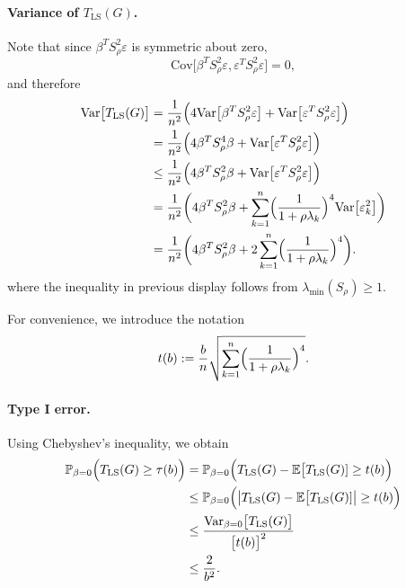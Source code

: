 \documentclass{article}
\newcommand{\abs}[1]{\left \lvert #1 \right \rvert}
\newcommand{\Var}{\mathrm{Var}}
\newcommand{\Cov}{\mathrm{Cov}}
\newcommand{\1}{\mathbf{1}}
\newcommand{\Pbb}{\mathbb{P}}
\newcommand{\Ebb}{\mathbb{E}}
\newcommand{\LS}{\mathrm{LS}}
\theoremstyle{alden}
\theoremstyle{aldenthm}
\theoremstyle{definition}
\theoremstyle{remark}
\begin{document}
\paragraph{Variance of $T_{\LS}(G)$.}
Note that since $\beta^T S_{\rho}^2 \varepsilon$ is symmetric about zero, 
\begin{equation*}
\Cov\bigl[\beta^T S_{\rho}^2 \varepsilon, \varepsilon^T S_{\rho}^2 \varepsilon\bigr] = 0,
\end{equation*}
and therefore
\begin{align*}
\Var\bigl[T_{\LS}(G)\bigr] & = \frac{1}{n^2}\Bigl(4 \Var\bigl[\beta^T S_\rho^2 \varepsilon \bigr] + \Var\bigl[\varepsilon^T S_{\rho}^2 \varepsilon\bigr]\Bigr) \\
& = \frac{1}{n^2}\Bigl(4 \beta^T S_{\rho}^4 \beta + \Var\bigl[\varepsilon^T S_{\rho}^2 \varepsilon\bigr]\Bigr) \\
& \leq \frac{1}{n^2}\Bigl(4 \beta^T S_{\rho}^2 \beta + \Var\bigl[\varepsilon^T S_{\rho}^2 \varepsilon\bigr]\Bigr) \\
& = \frac{1}{n^2}\biggl(4 \beta^T  S_{\rho}^2 \beta + \sum_{k = 1}^{n} \Bigl(\frac{1}{1 + \rho \lambda_k}\Bigr)^4 \Var\bigl[\varepsilon_k^2\bigr]\biggr) \\
& = \frac{1}{n^2}\biggl(4 \beta^T S_{\rho}^2 \beta + 2\sum_{k = 1}^{n} \Bigl(\frac{1}{1 + \rho \lambda_k}\Bigr)^4 \biggr).
\end{align*}
where the inequality in previous display follows from $\lambda_{\min}(S_{\rho}) \geq 1$.

For convenience, we introduce the notation 
\begin{equation*}
t(b) := \frac{b}{n}\sqrt{\sum_{k = 1}^{n} \Bigl(\frac{1}{1 + \rho \lambda_k}\Bigr)^4}.
\end{equation*}
\paragraph{Type I error.}
Using Chebyshev's inequality, we obtain
\begin{align*}
\Pbb_{\beta = 0}\Bigl(T_{\LS}(G) \geq \tau(b)\Bigr) & = \Pbb_{\beta = 0}\Bigl(T_{\LS}(G) - \Ebb\bigl[T_{\LS}(G)] \geq t(b)\Bigr) \\
& \leq \Pbb_{\beta = 0}\Bigl(\abs{T_{\LS}(G) - \Ebb\bigl[T_{\LS}(G)]} \geq t(b)\Bigr) \\
& \leq \frac{\Var_{\beta = 0}\bigl[T_{\LS}(G)\bigr]}{\bigl[t(b)\bigr]^2} \\
& \leq \frac{2}{b^2}.
\end{align*}
\end{document}
